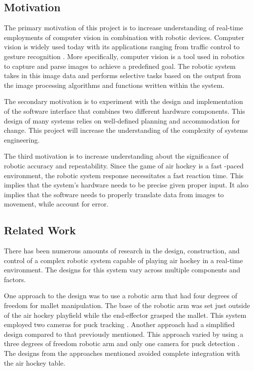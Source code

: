 \documentclass[letterpaper, 12 pt, conference]{ieeeconf}
\begin{document}
\subsection{Motivation}
\label{motivation}
The primary motivation of this project is to increase understanding of real-time employments of computer vision in combination with robotic devices. Computer vision is widely used today with its applications ranging from traffic control\cite{aliane} to gesture recognition \cite{bhame}.  More specifically, computer vision is a tool used in robotics to capture and parse images to achieve a predefined goal. The robotic system takes in this image data and performs selective tasks based on the output from the image processing algorithms and functions written within the system. 

The secondary motivation is to experiment with the design and implementation of the software interface that combines two different hardware components. This design of many systems relies on well-defined planning and accommodation for change. This project will increase the understanding of the complexity of systems engineering.

The third motivation is to increase understanding about the significance of robotic accuracy and repeatability. Since the game of air hockey is a fast -paced environment, the robotic system response necessitates a fast reaction time.  This implies that the system’s hardware needs to be precise given proper input.  It also implies that the software needs to properly translate data from images to movement, while account for error.

\subsection{Related Work}
\label{relatedwork}
There has been numerous amounts of research in the design, construction, and control of a complex robotic system capable of playing air hockey in a real-time environment. The designs for this system vary across multiple components and factors.

One approach to the design was to use a robotic arm that had four degrees of freedom for mallet manipulation.  The base of the robotic arm was set just outside of the air hockey playfield while the end-effector grasped the mallet.  This system employed two cameras for puck tracking \cite{namiki}. Another approach had a simplified design compared to that previously mentioned. This approach varied by using a three degrees of freedom robotic arm and only one camera for puck detection \cite{bishop}. The designs from the approaches mentioned avoided complete integration with the air hockey table.
\end{document}
